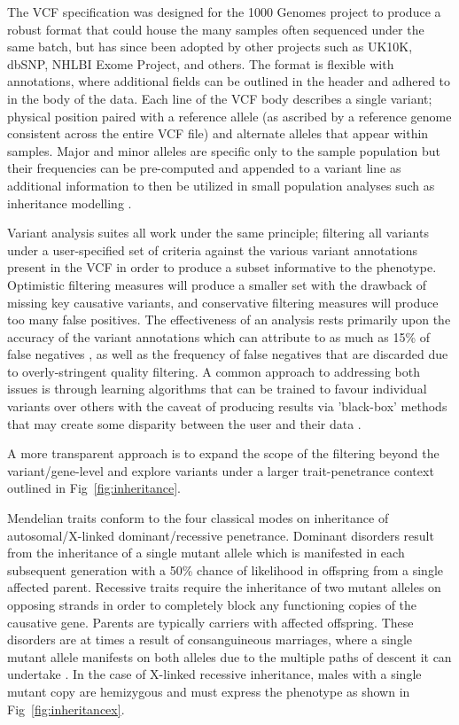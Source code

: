 The VCF specification was designed for the 1000 Genomes project to produce a robust format that could house the many samples often sequenced under the same batch, but has since been adopted by other projects such as UK10K, dbSNP, NHLBI Exome Project, and others. The format is flexible with annotations, where additional fields can be outlined in the header and adhered to in the body of the data. Each line of the VCF body describes a single variant; physical position paired with a reference allele (as ascribed by a reference genome consistent across the entire VCF file) and alternate alleles that appear within samples. Major and minor alleles are specific only to the sample population but their frequencies can be pre-computed and appended to a variant line as additional information to then be utilized in small population analyses such as inheritance modelling \citep{danecek2011variant}.

Variant analysis suites all work under the same principle; filtering all variants under a user-specified set of criteria against the various variant annotations present in the VCF in order to produce a subset informative to the phenotype. Optimistic filtering measures will produce a smaller set with the drawback of missing key causative variants, and conservative filtering measures will produce too many false positives. The effectiveness of an analysis rests primarily upon the accuracy of the variant annotations which can attribute to as much as 15\% of false negatives \citep{warden2014detailed}, as well as the frequency of false negatives that are discarded due to overly-stringent quality filtering. A common approach to addressing both issues is through learning algorithms that can be trained to favour individual variants over others with the caveat of producing results via 'black-box' methods that may create some disparity between the user and their data \citep{pabinger2014survey}. 

A more transparent approach is to expand the scope of the filtering beyond the variant/gene-level and explore variants under a larger trait-penetrance context outlined in Fig~\ref{fig:inheritance}.

Mendelian traits conform to the four classical modes on inheritance of autosomal/X-linked dominant/recessive penetrance. Dominant disorders result from the inheritance of a single mutant allele which is manifested in each subsequent generation with a 50\% chance of likelihood in offspring from a single affected parent. Recessive traits require the inheritance of two mutant alleles on opposing strands in order to completely block any functioning copies of the causative gene. Parents are typically carriers with affected offspring. These disorders are at times a result of consanguineous marriages, where a single mutant allele manifests on both alleles due to the multiple paths of descent it can undertake \citep{kari2014consanguinity}. In the case of X-linked recessive inheritance, males with a single mutant copy are hemizygous and must express the phenotype as shown in Fig~\ref{fig:inheritancex}.

